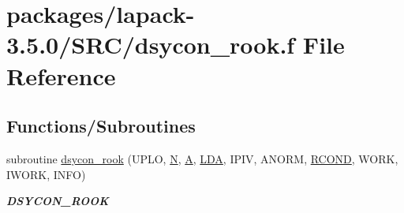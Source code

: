 \hypertarget{dsycon__rook_8f}{}\section{packages/lapack-\/3.5.0/\+S\+R\+C/dsycon\+\_\+rook.f File Reference}
\label{dsycon__rook_8f}
\subsection*{Functions/\+Subroutines}
\begin{DoxyCompactItemize}
\item 
subroutine \hyperlink{group__doubleSYcomputational_gac660ec214d2d8132c7d4e75e5c497d42}{dsycon\+\_\+rook} (U\+P\+L\+O, \hyperlink{polmisc_8c_a0240ac851181b84ac374872dc5434ee4}{N}, \hyperlink{classA}{A}, \hyperlink{example__user_8c_ae946da542ce0db94dced19b2ecefd1aa}{L\+D\+A}, I\+P\+I\+V, A\+N\+O\+R\+M, \hyperlink{superlu__enum__consts_8h_af00a42ecad444bbda75cde1b64bd7e72a9b5c151728d8512307565994c89919d5}{R\+C\+O\+N\+D}, W\+O\+R\+K, I\+W\+O\+R\+K, I\+N\+F\+O)
\begin{DoxyCompactList}\small\item\em {\bfseries D\+S\+Y\+C\+O\+N\+\_\+\+R\+O\+O\+K} \end{DoxyCompactList}\end{DoxyCompactItemize}
